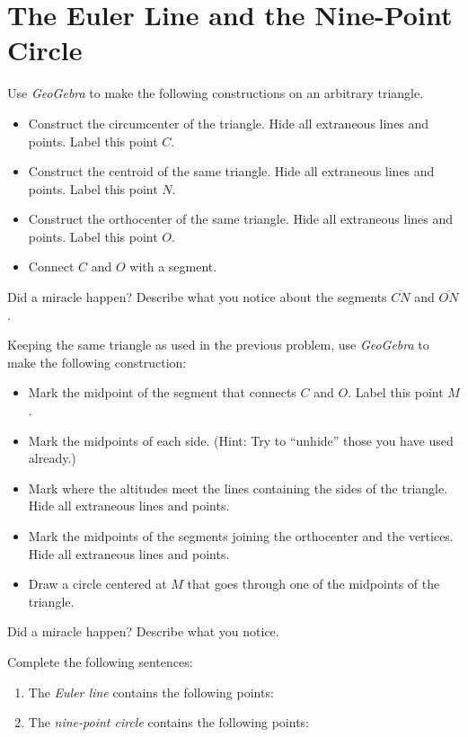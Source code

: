 \newpage
\section{The Euler Line and the Nine-Point Circle} 

\begin{prob} 
Use \textsl{GeoGebra} to make the following constructions on an arbitrary triangle.  
\begin{itemize}
\itemsep -3pt
\item Construct the circumcenter of the 
triangle. Hide all extraneous lines and points. Label this point $C$.
\item Construct the centroid of the same triangle. Hide
all extraneous lines and points. Label this point $N$.
\item Construct the orthocenter of the same triangle. Hide
all extraneous lines and points. Label this point $O$.
\item Connect $C$ and $O$ with a segment. 
\end{itemize}
Did a miracle happen?  Describe what you notice about the 
segments $\overline{CN}$ and $\overline{ON}$.    
\end{prob}
\vfill
\begin{prob}
Keeping the same triangle as used in the previous problem, use \textsl{GeoGebra} to make the following construction:  
\begin{itemize}
\itemsep -3pt
\item Mark the midpoint of the segment that connects $C$ and $O$. Label this point $M$.
\item Mark the midpoints of each side. (Hint: Try to ``unhide'' those you have used already.)
\item Mark where the altitudes
meet the lines containing the sides of the triangle. Hide all
extraneous lines and points.
\item Mark the midpoints of
the segments joining the orthocenter and the vertices. Hide all
extraneous lines and points.
\item Draw a circle centered at $M$ that goes through one of the midpoints of the triangle.
\end{itemize}
 Did a miracle happen?  Describe what you notice.  
\end{prob}
\vfill
\begin{prob}
Complete the following sentences:  
\begin{enumerate}
\item The \emph{Euler line} contains the following points:  
\vfill
\item The \emph{nine-point circle} contains the following points:  
\end{enumerate}
\end{prob}
\vfill

